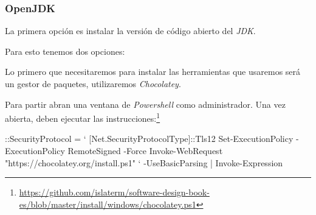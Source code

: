\subsubsection{OpenJDK}
  La primera opción es instalar la versión de código abierto del \textit{JDK}.

  Para esto tenemos dos opciones:
  \begin{defaultbox}
    Lo primero que necesitaremos para instalar las herramientas que usaremos será un gestor de 
    paquetes, utilizaremos \textit{Chocolatey}.\autocite{choco}
  
    Para partir abran una ventana de \textit{Powershell} como administrador.
    Una vez abierta, deben ejecutar las instrucciones:\footnote{
      \url{https://github.com/islaterm/software-design-book-es/blob/master/install/windows/chocolatey.ps1}
    }
    \begin{powershell}
      ::SecurityProtocol = `
        [Net.SecurityProtocolType]::Tls12
      Set-ExecutionPolicy -ExecutionPolicy RemoteSigned -Force
      Invoke-WebRequest "https://chocolatey.org/install.ps1" `
        -UseBasicParsing | Invoke-Expression
    \end{powershell}
  
  
    
    
  \end{defaultbox}
